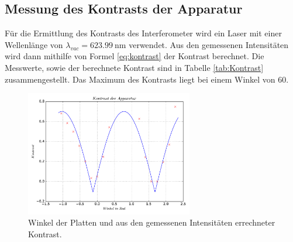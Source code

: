 \subsection{Messung des Kontrasts der Apparatur}
Für die Ermittlung des Kontrasts des Interferometer wird ein Laser mit einer Wellenlänge von $\lambda_{vac}=\SI{623.99}{\nano\meter}$ verwendet.
Aus den gemessenen Intensitäten wird dann mithilfe von Formel \eqref{eq:kontrast} der Kontrast berechnet.
Die Messwerte, sowie der berechnete Kontrast sind in Tabelle \ref{tab:Kontrast} zusammengestellt.
Das Maximum des Kontrasts liegt bei einem Winkel von 60\circ.\\
\begin{figure}[H]
  \center
  \includegraphics[width=0.65\textwidth]{kontrastplot.pdf}
  \caption{Winkel der Platten und aus den gemessenen Intensitäten errechneter Kontrast.}
  \label{fig:kontrastplot}
\end{figure}
